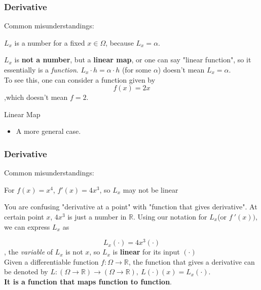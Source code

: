 \documentclass{beamer}
\begin{document}
\begin{frame}
    \frametitle{Derivative}
    Common misunderstandings:\\
    \vspace{0.5em}
    \begin{center}
        $L_x$ is a number for a fixed $x\in \Omega$, because $L_x=\alpha$.
    \end{center}
    \vspace{0.5em}
    \hspace{1em}
    $L_x$ is \textbf{not a number}, but a \textbf{linear map}, or one can say "linear function", so it essentially is a \emph{function}.
    $L_x\cdot h=\alpha\cdot h$ (for some $\alpha$) doesn't mean $L_x=\alpha$.\\
    \hspace{1em} To see this, one can consider a function given by
    \begin{equation*}
        f(x)=2x
    \end{equation*}
    ,which doesn't mean $f=2$.\\

    \begin{block}{Linear Map}
        \begin{itemize}
            \item A more general case.
        \end{itemize}
    \end{block}
\end{frame}
\begin{frame}
    \frametitle{Derivative}

    Common misunderstandings:\\
    \vspace{0.5em}
    \begin{center}
        For $f(x)=x^4$, $f'(x)=4x^3$, so $L_x$ may not be linear
    \end{center}
    \vspace{0.5em}

    \hspace{1em} You are confusing "derivative at a point" with "function that gives derivative".
    At certain point $x$, $4x^3$ is just a number in $\mathbb{R}$. Using our notation for $L_x$(or $f~'(x))$,
    we can express $L_x$ as

    \begin{equation*}
        L_x(\cdot)=4x^3(\cdot)
    \end{equation*}
    , the \emph{variable} of $L_x$ is not $x$, so $L_x$ is \textbf{linear} for its input $(\cdot)$\\
    \vspace{1em}
    Given a differentiable function $f:\Omega\rightarrow\mathbb{R}$, the function
    that gives a derivative can be denoted by $L:(\Omega\rightarrow\mathbb{R}) \to (\Omega\rightarrow\mathbb{R}),\ L(\cdot)(x)=L_x(\cdot)$.\\
    \textbf{It is a function that maps function to function}.


\end{frame}
\end{document}
